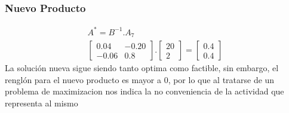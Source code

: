 \begin{homeworkProblem}[-1][Laboratorio]
\subsubsection{Nuevo Producto}
\begin{align*}
A^{*}=B^{-1}.A_7\\
    \begin{bmatrix}
        0.04 & -0.20 \\
        -0.06 & 0.8
    \end{bmatrix}.
    \begin{bmatrix}
        20 \\
        2        
    \end{bmatrix}=
    \begin{bmatrix}
        0.4 \\
        0.4
    \end{bmatrix}
\end{align*}
La solución nueva sigue siendo tanto optima como factible, sin embargo, el renglón \zero para el nuevo producto es mayor a $0$, por lo que al tratarse de un problema de maximizacion nos indica la no conveniencia de la actividad que representa al mismo
\end{homeworkProblem}